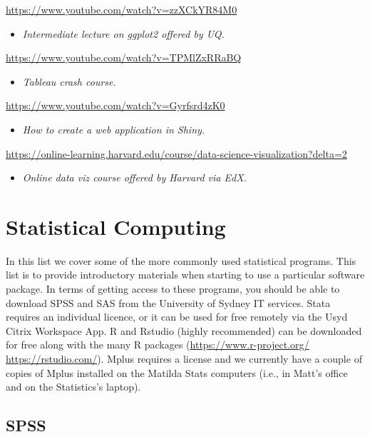 \documentclass[
]{book}
\providecommand{\tightlist}{%
  \setlength{\itemsep}{0pt}\setlength{\parskip}{0pt}}
\begin{document}
\url{https://www.youtube.com/watch?v=zzXCkYR84M0}

\begin{itemize}
\tightlist
\item
  \emph{Intermediate lecture on ggplot2 offered by UQ.}
\end{itemize}

\url{https://www.youtube.com/watch?v=TPMlZxRRaBQ}

\begin{itemize}
\tightlist
\item
  \emph{Tableau crash course.}
\end{itemize}

\url{https://www.youtube.com/watch?v=Gyrfsrd4zK0}

\begin{itemize}
\tightlist
\item
  \emph{How to create a web application in Shiny.}
\end{itemize}

\url{https://online-learning.harvard.edu/course/data-science-visualization?delta=2}

\begin{itemize}
\tightlist
\item
  \emph{Online data viz course offered by Harvard via EdX.}
\end{itemize}

\hypertarget{statistical-computing}{%
\chapter{Statistical Computing}\label{statistical-computing}}

In this list we cover some of the more commonly used statistical programs. This list is to provide introductory materials when starting to use a particular software package. In terms of getting access to these programs, you should be able to download SPSS and SAS from the University of Sydney IT services. Stata requires an individual licence, or it can be used for free remotely via the Usyd Citrix Workspace App. R and Rstudio (highly recommended) can be downloaded for free along with the many R packages (\url{https://www.r-project.org/} \url{https://rstudio.com/}). Mplus requires a license and we currently have a couple of copies of Mplus installed on the Matilda Stats computers (i.e., in Matt's office and on the Statistics's laptop).

\hypertarget{spss}{%
\section{SPSS}\label{spss}}
\end{document}
